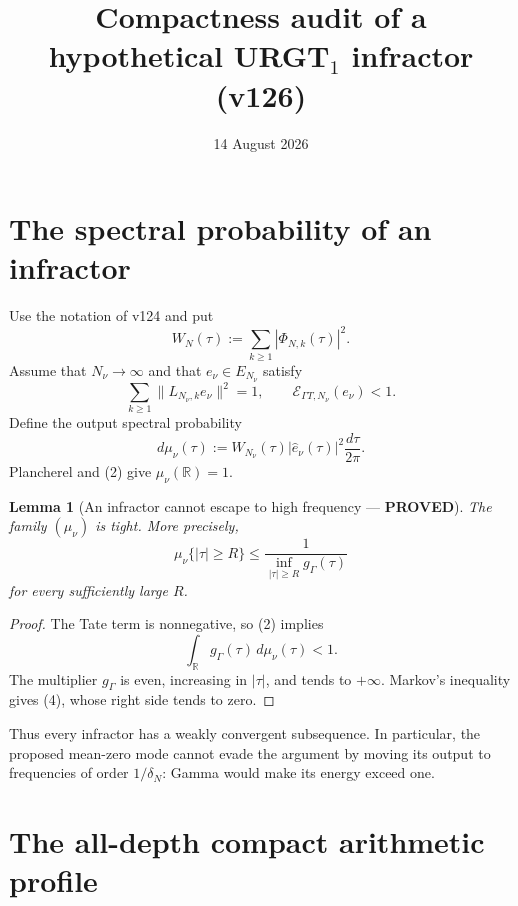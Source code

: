 \documentclass[11pt]{article}
\title{Compactness audit of a hypothetical URGT$_1$ infractor (v126)}
\date{14 August 2026}
\newcommand{\PROVED}{\textcolor{green!40!black}{\textbf{PROVED}}}
\newtheorem{lemma}{Lemma}
\begin{document}
\maketitle

\section{The spectral probability of an infractor}

Use the notation of v124 and put
\begin{equation}
 W_N(\tau):=\sum_{k\ge1}|\Phi_{N,k}(\tau)|^2.              \tag{1}
\end{equation}
Assume that $N_\nu\to\infty$ and that $e_\nu\in E_{N_\nu}$ satisfy
\begin{equation}
 \sum_{k\ge1}\|L_{N_\nu,k}e_\nu\|^2=1,
 \qquad
 \mathcal E_{\Gamma T,N_\nu}(e_\nu)<1.                  \tag{2}
\end{equation}
Define the output spectral probability
\begin{equation}
 d\mu_\nu(\tau)
 :=W_{N_\nu}(\tau)|\widehat e_\nu(\tau)|^2
       \frac{d\tau}{2\pi}.                               \tag{3}
\end{equation}
Plancherel and (2) give $\mu_\nu(\mathbb R)=1$.

\begin{lemma}[An infractor cannot escape to high frequency --- \PROVED]
The family $(\mu_\nu)$ is tight.  More precisely,
\begin{equation}
 \mu_\nu\{|\tau|\ge R\}
 \le\frac1{\inf_{|\tau|\ge R}g_\Gamma(\tau)}             \tag{4}
\end{equation}
for every sufficiently large $R$.
\end{lemma}

\begin{proof}
The Tate term is nonnegative, so (2) implies
\[
 \int_{\mathbb R}g_\Gamma(\tau)\,d\mu_\nu(\tau)<1.
\]
The multiplier $g_\Gamma$ is even, increasing in $|\tau|$, and tends to
$+\infty$.  Markov's inequality gives (4), whose right side tends to zero.
\end{proof}

Thus every infractor has a weakly convergent subsequence.  In particular,
the proposed mean-zero mode cannot evade the argument by moving its output
to frequencies of order $1/\delta_N$: Gamma would make its energy exceed
one.

\section{The all-depth compact arithmetic profile}
\end{document}

